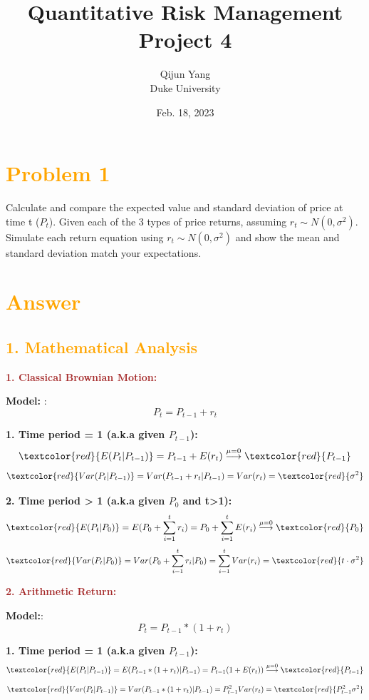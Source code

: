 \documentclass[11pt,en]{elegantpaper}
\title{Quantitative Risk Management Project 4}
\author{Qijun Yang \\ Duke University}
\institute{\href{https://fintech.meng.duke.edu}{Financial Technology at Duke University}}
\date{Feb. 18, 2023}
\begin{document}
\maketitle

\section*{\textcolor{orange}{Problem 1}}

Calculate and compare the expected value and standard deviation of price at time t ($P_t$). Given each of the 3 types of price returns, assuming $r_t\sim N(0,\sigma^2)$. Simulate each return equation using $r_t\sim N(0,\sigma^2)$ and show the mean and standard deviation match your expectations.

\section*{\textcolor{orange}{Answer}}

\subsection*{\textcolor{orange}{1. Mathematical Analysis}}

\textbf{\textcolor{brown}{1. Classical Brownian Motion: }}

\textbf{Model: }:
\[P_t=P_{t-1}+r_t\]

\textbf{1. Time period = 1 (a.k.a given $P_{t-1}$):}
\[\textcolor{red}{E(P_t|P_{t-1})}=P_{t-1}+E(r_t)\stackrel{\mu=0}{\longrightarrow}\textcolor{red}{P_{t-1}}\]
\[\textcolor{red}{Var(P_t|P_{t-1})}=Var(P_{t-1}+r_t|P_{t-1})=Var(r_t)=\textcolor{red}{\sigma^2}\]

\textbf{2. Time period > 1 (a.k.a given $P_0$ and t>1):}
\[\textcolor{red}{E(P_t|P_0)}=E(P_0+\sum_{i=1}^{t}r_i)=P_0+\sum_{i=1}^{t}E(r_i)\stackrel{\mu=0}{\longrightarrow}\textcolor{red}{P_0}\]
\[\textcolor{red}{Var(P_t|P_0)}=Var(P_0+\sum_{i=1}^{t}r_i|P_0)=\sum_{i=1}^{t}Var(r_i)=\textcolor{red}{t\cdot \sigma^2}\]

\textbf{\textcolor{brown}{2. Arithmetic Return:}}

\textbf{Model:}:
\[P_t=P_{t-1}*(1+r_t)\]

\textbf{1. Time period = 1 (a.k.a given $P_{t-1}$):}
\[\textcolor{red}{E(P_t|P_{t-1})}=E(P_{t-1}*(1+r_t)|P_{t-1})=P_{t-1}(1+E(r_t))\stackrel{\mu=0}{\longrightarrow}\textcolor{red}{P_{t-1}}
\]
\[\textcolor{red}{Var(P_t|P_{t-1})}=Var(P_{t-1}*(1+r_t)|P_{t-1})=P_{t-1}^2Var(r_t)=\textcolor{red}{P_{t-1}^2\sigma^2}\]
\end{document}

